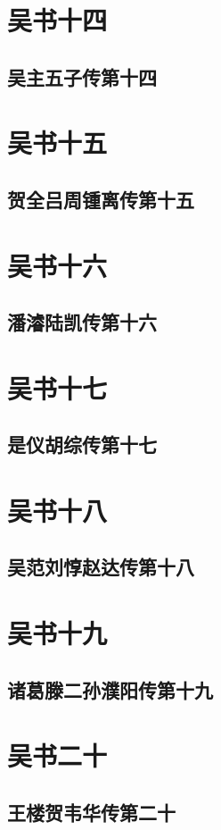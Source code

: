 \documentclass[12pt,UTF8]{ctexbook}
\begin{document}
\part{吴书十四}
\chapter{吴主五子传第十四}

\part{吴书十五}
\chapter{贺全吕周锺离传第十五}

\part{吴书十六}
\chapter{潘濬陆凯传第十六}

\part{吴书十七}
\chapter{是仪胡综传第十七}

\part{吴书十八}
\chapter{吴范刘惇赵达传第十八}

\part{吴书十九}
\chapter{诸葛滕二孙濮阳传第十九}

\part{吴书二十}
\chapter{王楼贺韦华传第二十}
\end{document}
